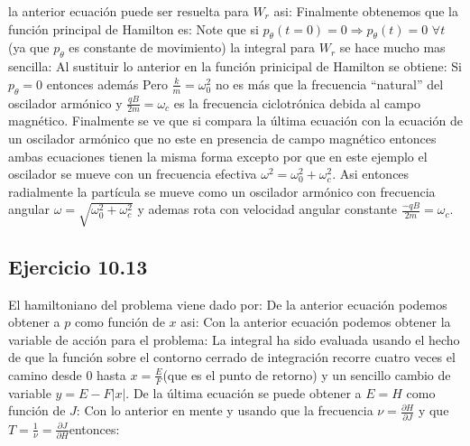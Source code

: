 la anterior ecuaci\'on puede ser resuelta para $W_r$ asi:
Finalmente obtenemos que la funci\'on principal de Hamilton es:
Note que si $p_\theta(t=0)=0\Rightarrow p_\theta(t)=0$  $\forall t$ (ya que $p_\theta$ es constante de movimiento) la integral para $W_r$ se hace mucho mas sencilla:
Al sustituir lo anterior en la funci\'on prinicipal de Hamilton se obtiene:
Si $p_\theta=0$ entonces adem\'as 
Pero $\frac{k}{m}=\omega_0^2$ no es m\'as que la frecuencia ``natural'' del oscilador arm\'onico y $\frac{q B}{2m}= \omega_c$  es la frecuencia ciclotr\'onica debida al campo magn\'etico. Finalmente se ve que si compara la \'ultima ecuaci\'on con la ecuaci\'on de un oscilador arm\'onico que no este en presencia de campo magn\'etico entonces ambas ecuaciones tienen la misma forma excepto por que en este ejemplo el oscilador se mueve con un frecuencia efectiva $\omega^2=\omega_0^2+\omega_c^2$. Asi entonces radialmente la part\'icula se mueve como un oscilador arm\'onico con frecuencia angular $\omega=\sqrt{\omega_0^2+\omega_c^2}$ y ademas rota con velocidad angular constante $\frac{-q B}{2 m}=\omega_c$.


\subsection*{Ejercicio 10.13}
El hamiltoniano del problema viene dado por:
De la anterior ecuaci\'on podemos obtener a $p$ como funci\'on de $x$ asi:
Con la anterior ecuaci\'on podemos obtener la variable de acci\'on para el problema:
La integral ha sido evaluada usando el hecho de que la funci\'on sobre el contorno cerrado de integraci\'on recorre cuatro veces el camino desde $0$ hasta $x=\frac{E}{F}$(que es el punto de retorno) y un sencillo cambio de variable $y=E-F|x|$. De la \'ultima ecuaci\'on se puede obtener a $E=H$ como funci\'on de $J$:
Con lo anterior en mente y usando que la frecuencia $\nu=\frac{\partial H}{\partial J}$ y que $T=\frac{1}{\nu}=\frac{\partial J}{\partial H}$entonces:
